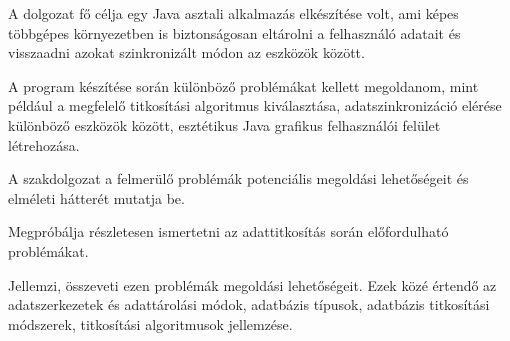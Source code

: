 
A dolgozat fő célja egy Java asztali alkalmazás elkészítése volt, ami képes többgépes környezetben is biztonságosan eltárolni a felhasználó adatait és visszaadni azokat szinkronizált módon az eszközök között.

A program készítése során különböző problémákat kellett megoldanom, mint például a megfelelő titkosítási algoritmus kiválasztása, adatszinkronizáció elérése különböző eszközök között, esztétikus Java grafikus felhasználói felület létrehozása.

A szakdolgozat a felmerülő problémák potenciális megoldási lehetőségeit és elméleti hátterét mutatja be.

Megpróbálja részletesen ismertetni az adattitkosítás során előfordulható problémákat.
 
Jellemzi, összeveti ezen problémák megoldási lehetőségeit. Ezek közé értendő az adatszerkezetek és adattárolási módok, adatbázis típusok, adatbázis titkosítási módszerek, titkosítási algoritmusok jellemzése.


